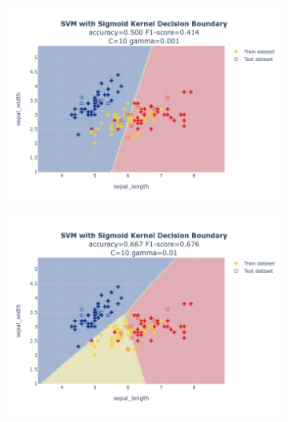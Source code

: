 \documentclass{article}
\begin{document}
\begin{figure}
\begin{subfigure}{0.3\textwidth}
        \includegraphics[scale=.13]{images/implementation/q1/sigmoid_kernel/sepal_length_sepal_width_10_0.001.png}
    \end{subfigure}
    \hfill
    \begin{subfigure}{0.3\textwidth}
        \centering
        \includegraphics[scale=.13]{images/implementation/q1/sigmoid_kernel/sepal_length_sepal_width_10_0.01.png}
    \end{subfigure}
    \hfill
    \begin{subfigure}{0.3\textwidth}
        \centering

\end{subfigure}
\end{figure}
\end{document}
